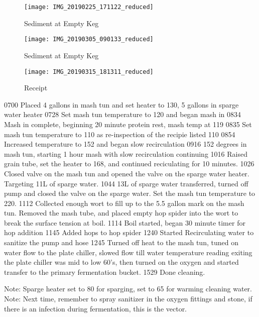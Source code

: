 \begin{figure}[H]
  \centering
  \texttt{[image: IMG\_20190225\_171122\_reduced]}
  \caption{Sediment at Empty Keg}\label{fig:keg2:empty}
\end{figure}

\begin{figure}[H]
  \centering
  \texttt{[image: IMG\_20190305\_090133\_reduced]}
  \caption{Sediment at Empty Keg}\label{fig:keg3:empty}
\end{figure}

\begin{figure}[H]
  \centering
  \texttt{[image: IMG\_20190315\_181311\_reduced]}
  \caption{Receipt}\label{fig:brew:receipt}
\end{figure}

\def\todaysdate{20190317}
\newday{\todaysdate}\label{\todaysdate}

0700 Placed 4 gallons in mash tun and set heater to 130, 5 gallons in sparge water heater
0728 Set mash tun temperature to 120 and began mash in
0834 Mash in complete, beginning 20 minute protein rest, mash temp at 119
0835 Set mash tun temperature to 110 as re-inspection of the recipie listed 110
0854 Increased temperature to 152 and began slow recirculation
0916 152 degrees in mash tun, starting 1 hour mash with slow recirculation continuing
1016 Raised grain tube, set the heater to 168, and continued reciculating for 10 minutes.
1026 Closed valve on the mash tun and opened the valve on the sparge water heater.  Targeting 11L of sparge water.
1044 13L of sparge water transferred, turned off pump and closed the valve on the sparge water.  Set the mash tun temperature to 220.
1112 Collected enough wort to fill up to the 5.5 gallon mark on the mash tun.  Removed the mash tube, and placed empty hop spider into the wort to break the surface tension at boil.
1114 Boil started, began 30 minute timer for hop addition
1145 Added hops to hop spider
1240 Started Recirculating water to sanitize the pump and hose
1245 Turned off heat to the mash tun, tuned on water flow to the plate chiller, slowed flow till water temperature reading exiting the plate chiller was mid to low 60's, then turned on the oxygen and started transfer to the primary fermentation bucket.
1529 Done cleaning.

Note: Sparge heater set to 80 for sparging, set to 65 for warming cleaning water.
Note: Next time, remember to spray sanitizer in the oxygen fittings and stone, if there is an infection during fermentation, this is the vector.


